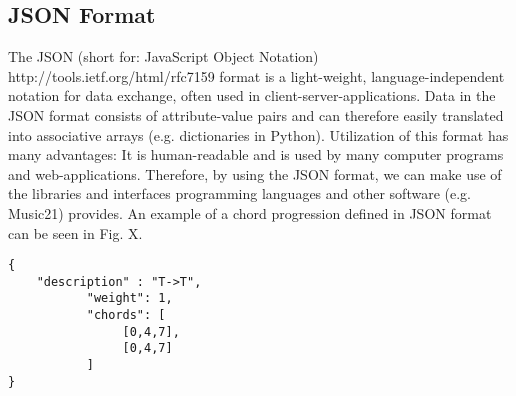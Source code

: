 \subsection{JSON Format}
The JSON (short for: JavaScript Object Notation) http://tools.ietf.org/html/rfc7159 format is a light-weight, language-independent notation for data exchange, often used in client-server-applications. Data in the JSON format consists of attribute-value pairs and can therefore easily translated into associative arrays (e.g. dictionaries in Python). Utilization of this format has many advantages: It is human-readable and is used by many computer programs and web-applications. Therefore, by using the JSON format, we can make use of the libraries and interfaces programming languages and other software (e.g. Music21) provides. An example of a chord progression defined in JSON format can be seen in Fig. X.

\begin{verbatim}
{
	"description" : "T->T",
           "weight": 1,
           "chords": [
                [0,4,7],
                [0,4,7]
           ]
}
\end{verbatim}